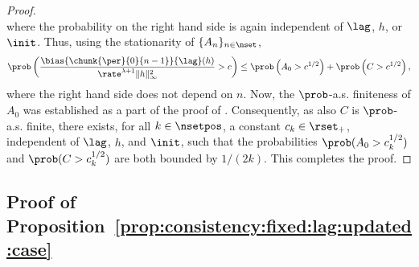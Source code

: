 \begin{proof}
$$$$
where the probability on the right hand side is again independent of $\lag$, $h$, or $\init$. Thus, using the stationarity of $\{ A_n \}_{n \in \nset}$, 
$$
\prob \left( \frac{\bias{\chunk{\per}{0}{n - 1}}{\lag}(h)}{\rate^{\lambda + 1} \| h \|_{\infty}^2} > c \right) \leq \prob \left( A_0 > c^{1/2} \right)  + \prob \left( C > c^{1/2} \right), 
$$ 
where the right hand side does not depend on $n$. Now, the $\prob$-a.s. finiteness of $A_0$ was established as a part of the proof of \cite[Theorem~10]{douc:moulines:olsson:2014}. Consequently, as also $C$ is $\prob$-a.s. finite, there exists, for all $k \in \nsetpos$, a constant $c_k \in \rset_+$, independent of $\lag$, $h$, and $\init$, such that the probabilities $\prob( A_0 > c^{1/2}_k)$ and $\prob( C > c^{1/2}_k)$ are both bounded by $1/(2 k)$. This  completes the proof. 
\end{proof}


\subsection{Proof of Proposition~\ref{prop:consistency:fixed:lag:updated:case}} 

